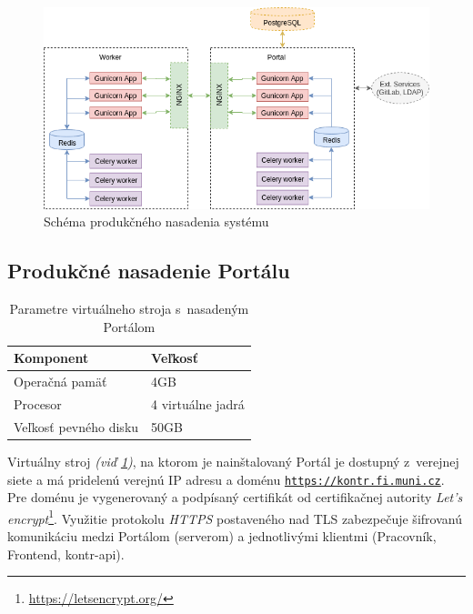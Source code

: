 \documentclass[
  digital, %
  oneside, %
  table,   %
  lof,     %
  lot,   %
]{fithesis3}
\begin{document}
\begin{figure}[!ht]
  \begin{center}
    \includegraphics[width=\textwidth]{imgs/sys-deploy.png}
  \end{center}
    \caption{Schéma produkčného nasadenia systému}
    \label{fig:prod-deploy}
\end{figure}

\subsection{Produkčné nasadenie Portálu}

\begin{table}[h]
\begin{tabular}{l l}
Komponent & Veľkosť \\ [0.5ex] 
\hline
Operačná pamäť & 4GB  \\
Procesor & 4 virtuálne jadrá  \\
Veľkosť pevného disku&  50GB \\
\end{tabular}

\caption{Parametre virtuálneho stroja s~nasadeným Portálom} \label{tab:machine-portal}

\end{table}

Virtuálny stroj \emph{(viď \ref{tab:machine-portal})}, na ktorom je nainštalovaný Portál je dostupný z~verejnej siete a má pridelenú verejnú IP adresu a doménu \texttt{\url{https://kontr.fi.muni.cz}}. Pre doménu je vygenerovaný a podpísaný certifikát od certifikačnej autority \emph{Let's encrypt}\footnote{\url{https://letsencrypt.org/}}. Využitie protokolu \emph{HTTPS}\cite{RFC2818} postaveného nad TLS\cite{RFC8446} zabezpečuje šifrovanú komunikáciu medzi Portálom (serverom) a jednotlivými klientmi (Pracovník, Frontend, kontr-api).
\end{document}
